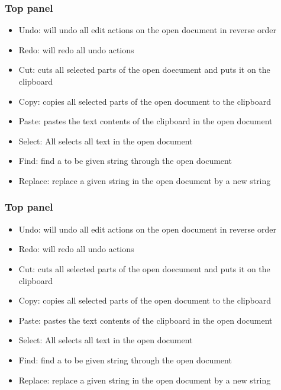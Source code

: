     \subsubsection{Top panel}
        \begin{itemize}
            \item Undo: will undo all edit actions on the open document in reverse order
            \item Redo: will redo all undo actions
            \item Cut: cuts all selected parts of the open doecument and puts it on the clipboard
            \item Copy: copies all selected parts of the open document to the clipboard
            \item Paste: pastes the text contents of the clipboard in the open document
            \item Select: All selects all text in the open document
            \item Find: find a to be given string through the open document
            \item Replace: replace a given string in the open document by a new string
        \end{itemize}

    \subsubsection{Top panel}
        \begin{itemize}
            \item Undo: will undo all edit actions on the open document in reverse order
            \item Redo: will redo all undo actions
            \item Cut: cuts all selected parts of the open doecument and puts it on the clipboard
            \item Copy: copies all selected parts of the open document to the clipboard
            \item Paste: pastes the text contents of the clipboard in the open document
            \item Select: All selects all text in the open document
            \item Find: find a to be given string through the open document
            \item Replace: replace a given string in the open document by a new string
        \end{itemize}




